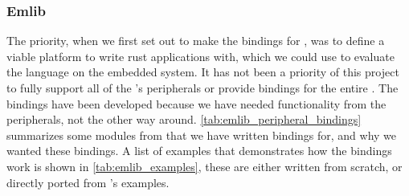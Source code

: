 \subsubsection{Emlib}

The priority, when we first set out to make the bindings for {\emlib}, was to define a viable platform to write rust applications with, which we could use to evaluate the language on the embedded system.
It has not been a priority of this project to fully support all of the {\gecko}'s peripherals or provide bindings for the entire {\emlib}.
The bindings have been developed because we have needed functionality from the peripherals, not the other way around.
\autoref{tab:emlib_peripheral_bindings} summarizes some modules from {\emlib} that we have written bindings for, and why we wanted these bindings.
A list of examples that demonstrates how the bindings work is shown in \autoref{tab:emlib_examples}, these are either written from scratch, or directly ported from {\emlib}'s examples.

